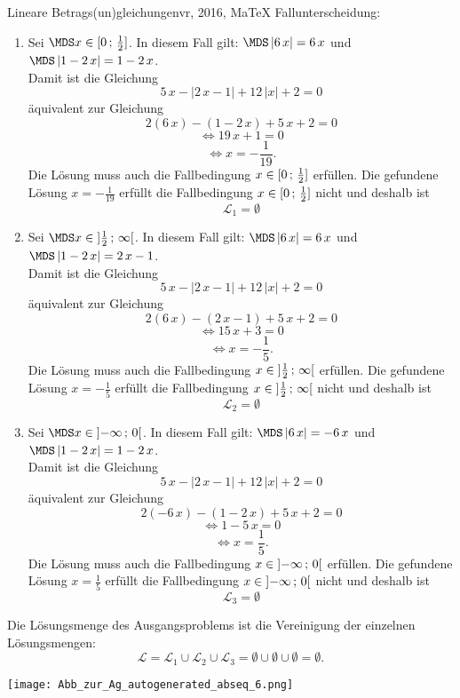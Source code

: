 \begin{MAufgabe}{Lineare Betrags(un)gleichungen}{vr, 2016, MaTeX}
 Fallunterscheidung: 

 \begin{enumerate} 
 \item Sei $ \MDS x\in[ 0 \, \MIntvlSep \, \frac{1}{2}]$. 
 In diesem Fall gilt: 
  $ \MDS \left| 6\, x\right|=6\, x$ und $ \MDS \left| 1 - 2\, x\right|=1 - 2\, x$. \\ 
 Damit ist die Gleichung 
 $$ 
5\, x - \left|2\, x - 1\right| + 12\, \left|x\right| + 2= 0
$$
 \"aquivalent zur Gleichung
 $$ 
2\left(6\, x\right)-\left( 1 - 2\, x\right)+5\, x+2= 0 
$$  
$$ 
 \Leftrightarrow 19\, x + 1= 0 
$$  
$$ \Leftrightarrow x = - \frac{1}{19} . 
 $$ 
 Die L\"osung muss auch die Fallbedingung $x\in [ 0 \, ; \, \frac{1}{2}] $ erf\"ullen. Die gefundene L\"osung $x=- \frac{1}{19}$ erf\"ullt die Fallbedingung  $x\in [ 0 \, ; \, \frac{1}{2}]$ nicht und deshalb ist  $$
 \mathcal{L}_{1}=\emptyset 
 $$ 
\item Sei $ \MDS x\in\MoIl  \frac{1}{2} \, \MIntvlSep \, \infty\MoIr $. 
 In diesem Fall gilt: 
  $ \MDS \left| 6\, x\right|=6\, x$ und $ \MDS \left| 1 - 2\, x\right|=2\, x - 1$. \\ 
 Damit ist die Gleichung 
 $$ 
5\, x - \left|2\, x - 1\right| + 12\, \left|x\right| + 2= 0
$$
 \"aquivalent zur Gleichung
 $$ 
2\left(6\, x\right)-\left( 2\, x - 1\right)+5\, x+2= 0 
$$  
$$ 
 \Leftrightarrow 15\, x + 3= 0 
$$  
$$ \Leftrightarrow x = - \frac{1}{5} . 
 $$ 
 Die L\"osung muss auch die Fallbedingung $x\in \mbox{}]\mathopen{}  \frac{1}{2} \, ; \, \infty[\mbox{}  $ erf\"ullen. Die gefundene L\"osung $x=- \frac{1}{5}$ erf\"ullt die Fallbedingung  $x\in \mbox{}]\mathopen{}  \frac{1}{2} \, ; \, \infty[\mbox{} $ nicht und deshalb ist  $$
 \mathcal{L}_{2}=\emptyset 
 $$ 
\item Sei $ \MDS x\in\MoIl  -\infty \, \MIntvlSep \, 0\MoIr $. 
 In diesem Fall gilt: 
  $ \MDS \left| 6\, x\right|=- 6\, x$ und $ \MDS \left| 1 - 2\, x\right|=1 - 2\, x$. \\ 
 Damit ist die Gleichung 
 $$ 
5\, x - \left|2\, x - 1\right| + 12\, \left|x\right| + 2= 0
$$
 \"aquivalent zur Gleichung
 $$ 
2\left(- 6\, x\right)-\left( 1 - 2\, x\right)+5\, x+2= 0 
$$  
$$ 
 \Leftrightarrow 1 - 5\, x= 0 
$$  
$$ \Leftrightarrow x = \frac{1}{5} . 
 $$ 
 Die L\"osung muss auch die Fallbedingung $x\in \mbox{}]\mathopen{}  -\infty \, ; \, 0[\mbox{}  $ erf\"ullen. Die gefundene L\"osung $x=\frac{1}{5}$ erf\"ullt die Fallbedingung  $x\in \mbox{}]\mathopen{}  -\infty \, ; \, 0[\mbox{} $ nicht und deshalb ist  $$
 \mathcal{L}_{3}=\emptyset 
 $$ 
 \end{enumerate} 
  Die L\"osungsmenge des Ausgangsproblems ist die Vereinigung der einzelnen L\"osungsmengen: 
$$ \mathcal{L} = \mathcal{L}_{1} \cup \mathcal{L}_{2} \cup \mathcal{L}_{3} 
 = \emptyset\cup \emptyset\cup \emptyset 
   =\emptyset 
   . $$ 
 
 \begin{center}
 \texttt{[image: Abb\_zur\_Ag\_autogenerated\_abseq\_6.png]} \end{center}
 
\else\relax\fi
 \end{MAufgabe}